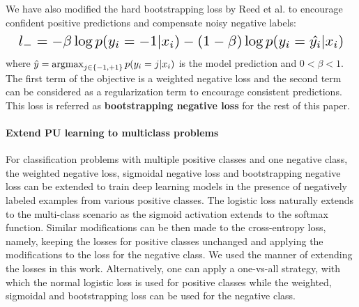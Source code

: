 We have also modified the hard bootstrapping loss by Reed et al.\cite{reed2014training} to encourage confident positive predictions and compensate noisy negative labels:
\begin{equation*}
  \resizebox{\columnwidth}{!}{
    $l_{-} = - \beta \log p(y_i=-1 \vert x_i) - (1-\beta) \log p(y_i=\hat{y_i} \vert x_i)$
    }
\end{equation*}
where $\hat{y} = \operatorname*{argmax}_{j\in\{-1,+1\}}{p(y_i=j \vert x_i)}$ is the model prediction and $0<\beta<1$.
The first term of the objective is a weighted negative loss and the second term can be considered as a regularization term to encourage consistent predictions.
This loss is referred as \textbf{bootstrapping negative loss} for the rest of this paper.

\paragraph{Extend PU learning to multiclass problems}

For classification problems with multiple positive classes and one negative class, the weighted negative loss, sigmoidal negative loss and bootstrapping negative loss can be extended to train deep learning models in the presence of negatively labeled examples from various positive classes.
The logistic loss naturally extends to the multi-class scenario as the sigmoid activation extends to the softmax function.
Similar modifications can be then made to the cross-entropy loss, namely, keeping the losses for positive classes unchanged and applying the modifications to the loss for the negative class.
We used the manner of extending the losses in this work.
Alternatively, one can apply a one-vs-all strategy, with which the normal logistic loss is used for positive classes while the weighted, sigmoidal and bootstrapping loss can be used for the negative class.

